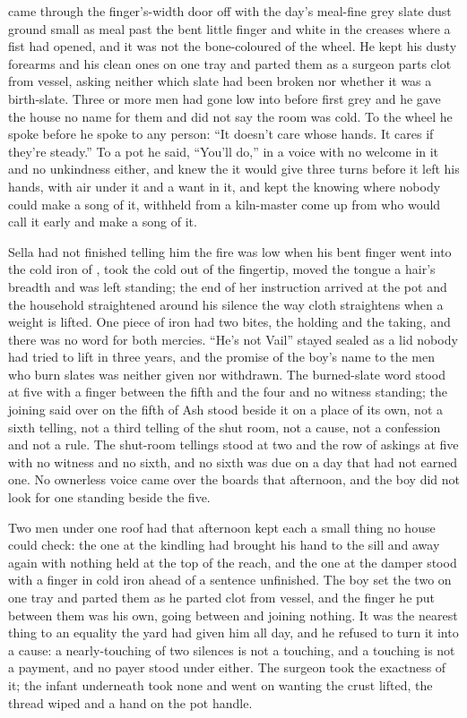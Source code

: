 \scenebreak

 came through the finger's-width door off  with the day's meal-fine grey slate dust ground small as meal past the bent little finger and white in the creases where a fist had opened, and it was not the bone-coloured  of the wheel. He kept his dusty forearms and his clean ones on one tray and parted them as a surgeon parts clot from vessel, asking neither which slate had been broken nor whether it was a birth-slate. Three or more men had gone low into  before first grey and he gave the house no name for them and did not say the room was cold. To the wheel he spoke before he spoke to any person: “It doesn't care whose hands. It cares if they're steady.” To a pot he said, “You'll do,” in a voice with no welcome in it and no unkindness either, and knew the  it would give three turns before it left his hands, with air under it and a want in it, and kept the knowing where nobody could make a song of it, withheld from a kiln-master come up from  who would call it early and make a song of it.

Sella had not finished telling him the fire was low when his bent finger went into the cold iron of , took the cold out of the fingertip, moved the tongue a hair's breadth and was left standing; the end of her instruction arrived at the pot and the household straightened around his silence the way cloth straightens when a weight is lifted. One piece of iron had two bites, the holding and the taking, and there was no  word for both mercies. “He's not Vail” stayed sealed as a lid nobody had tried to lift in three years, and the promise of the boy's name to the men who burn slates was neither given nor withdrawn. The burned-slate word stood at five with a finger between the fifth and the four and no witness standing; the joining said over  on the fifth of Ash stood beside it on a place of its own, not a sixth telling, not a third telling of the shut room, not a cause, not a confession and not a rule. The shut-room tellings stood at two and the row of askings at five with no witness and no sixth, and no sixth was due on a day that had not earned one. No ownerless voice came over the boards that afternoon, and the boy did not look for one standing beside the five.

Two men under one roof had that afternoon kept each a small thing no house could check: the one at the kindling had brought his hand to the sill and away again with nothing held at the top of the reach, and the one at the damper stood with a finger in cold iron ahead of a sentence unfinished. The boy set the two on one tray and parted them as he parted clot from vessel, and the finger he put between them was his own, going between and joining nothing. It was the nearest thing to an equality the yard had given him all day, and he refused to turn it into a cause: a nearly-touching of two silences is not a touching, and a touching is not a payment, and no payer stood under either. The surgeon took the exactness of it; the infant underneath took none and went on wanting the crust lifted, the thread wiped and a hand on the pot handle.

